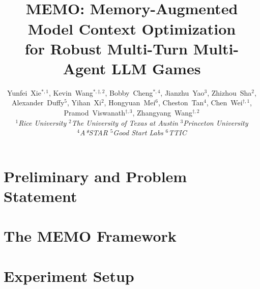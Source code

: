 \documentclass[11pt]{cambrian}
\title{\quad\\ \vspace*{-1.8cm} \center MEMO: Memory-Augmented Model Context Optimization \\ for Robust Multi-Turn Multi-Agent LLM Games\quad\\ \vspace*{-0.3cm} }
\author{Yunfei~Xie$^{*,1}$, Kevin~Wang$^{*,\ddagger,2}$, Bobby~Cheng$^{*,4}$, Jianzhu~Yao$^{3}$, Zhizhou~Sha$^{2}$, Alexander~Duffy$^{5}$, Yihan~Xi$^{2}$, Hongyuan~Mei$^{6}$, Cheston~Tan$^{4}$, 
Chen~Wei$^{\dagger,1}$, Pramod~Viswanath$^{\dagger,3}$, Zhangyang~Wang$^{\dagger,2}$\\
\small{\textit{$^1$Rice University} \quad \textit{$^2$The University of Texas at Austin} \quad \textit{$^3$Princeton University}}\\
\small{\textit{$^4$A*STAR} \quad \textit{$^5$Good Start Labs} \quad \textit{$^6$TTIC}}
}
\newcommand{\NAME}{MEMO}
\begin{document}


\maketitle
\vspace{0.1cm}



% 

% 



\section{Preliminary and Problem Statement}
\label{problem_statement} 




\section{The \NAME{} Framework}
\label{method}


\section{Experiment Setup}
\label{experiment}

\end{document}
